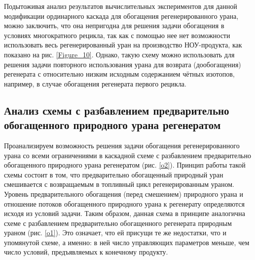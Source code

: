 Подытоживая анализ результатов вычислительных экспериментов для данной модификации ординарного каскада для обогащения регенерированного урана, можно заключить, что она непригодна для решения задачи обогащения в условиях многократного рецикла, так как с помощью нее нет возможности использовать весь регенерированный уран на производство НОУ-продукта, как показано на рис. \ref{Figure_10}. Однако, такую схему можно использовать для решения задачи повторного использования урана для возврата (дообогащения) регенерата с относительно низким исходным содержанием чётных изотопов, например, в случае обогащения регенерата первого рецикла.


\subsection{Анализ схемы с разбавлением предварительно обогащенного природного урана регенератом}

Проанализируем возможность решения задачи обогащения регенерированного урана со всеми ограничениями в каскадной схеме с разбавлением предварительно обогащенного природного урана регенератом (рис. \ref{o2}). Принцип работы такой схемы состоит в том, что предварительно обогащенный природный уран смешивается с возвращаемым в топливный цикл регенерированным ураном. Уровень предварительного обогащения (перед смешением) природного урана и отношение потоков обогащенного природного урана к регенерату определяются исходя из условий задачи. Таким образом, данная схема в принципе аналогична схеме с разбавлением предварительно обогащенного регенерата природным ураном (рис. \ref{o1}). Это означает, что ей присущи те же недостатки, что и упомянутой схеме, а именно: в ней число управляющих параметров меньше, чем число условий, предъявляемых к конечному продукту. 

